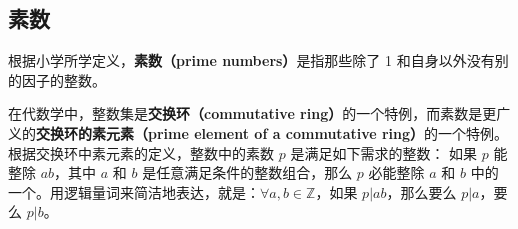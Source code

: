 \subsection{素数}

根据小学所学定义，\textbf{素数（prime numbers）}是指那些除了 1 和自身以外没有别的因子的整数。

在代数学中，整数集是\textbf{交换环（commutative ring）}的一个特例，而素数是更广义的\textbf{交换环的素元素（prime element of a commutative ring）}的一个特例。根据交换环中素元素的定义，整数中的素数 $p$ 是满足如下需求的整数：
如果 $p$ 能整除 $ab$，其中 $a$ 和 $b$ 是任意满足条件的整数组合，那么 $p$ 必能整除 $a$ 和 $b$ 中的一个。用逻辑量词来简洁地表达，就是：$\forall a, b\in \mathbb{Z}$，如果 $p|ab$，那么要么 $p|a$，要么 $p|b$。 
